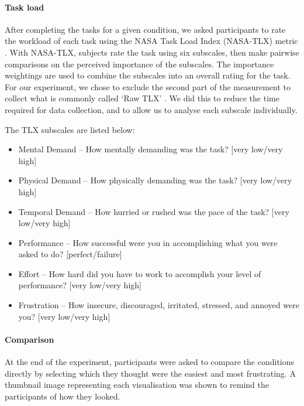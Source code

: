 \paragraph{Task load}
After completing the tasks for a given condition, we asked participants to rate the workload of each task using the
NASA Task Load Index (NASA-TLX) metric \citep{Hart1988}.  With NASA-TLX, subjects rate the task using six subscales,
then make pairwise comparisons on the perceived importance of the subscales. The importance weightings are used to
combine the subscales into an overall rating for the task. For our experiment, we chose to exclude the second part of
the measurement to collect what is commonly called `Raw TLX' \citep{Hart2006}. We did this to reduce the time required
for data collection, and to allow us to analyse each subscale individually.

The TLX subscales are listed below:

{\singlespacing
\begin{itemize}
  \item Mental Demand -- How mentally demanding was the task? [very low/very high]
  \item Physical Demand -- How physically demanding was the task? [very low/very high]
  \item Temporal Demand -- How hurried or rushed was the pace of the task?  [very low/very high]
  \item Performance -- How successful were you in accomplishing what you were asked to do? [perfect/failure]
  \item Effort -- How hard did you have to work to accomplish your level of performance? [very low/very high]
  \item Frustration -- How insecure, discouraged, irritated, stressed, and annoyed were you? [very low/very high]
\end{itemize}
}

\paragraph{Comparison}
At the end of the experiment, participants were asked to compare the conditions directly by selecting which they
thought were the easiest and most frustrating. A thumbnail image representing each visualisation was shown to remind
the participants of how they looked.


